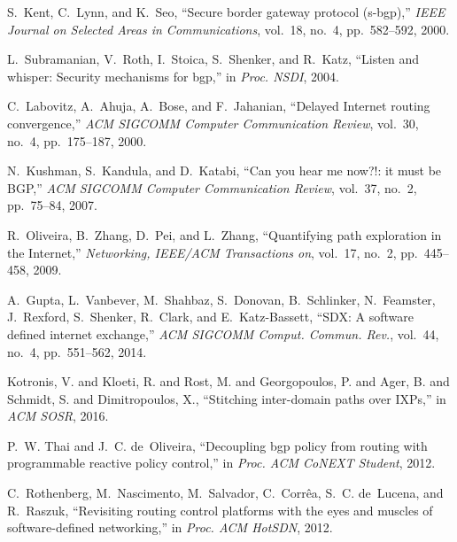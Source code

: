 \documentclass[10pt, conference, letterpaper]{IEEEtran}%
\begin{document}
%


%

%	
\begin{thebibliography}{10}

S.~Kent, C.~Lynn, and K.~Seo, ``Secure border gateway protocol (s-bgp),'' {\em
  IEEE Journal on Selected Areas in Communications}, vol.~18, no.~4,
  pp.~582--592, 2000.

L.~Subramanian, V.~Roth, I.~Stoica, S.~Shenker, and R.~Katz, ``Listen and
  whisper: Security mechanisms for bgp,'' in {\em Proc. NSDI}, 2004.

C.~Labovitz, A.~Ahuja, A.~Bose, and F.~Jahanian, ``Delayed {I}nternet routing
  convergence,'' {\em ACM SIGCOMM Computer Communication Review}, vol.~30,
  no.~4, pp.~175--187, 2000.

N.~Kushman, S.~Kandula, and D.~Katabi, ``Can you hear me now?!: it must be
  {BGP},'' {\em ACM SIGCOMM Computer Communication Review}, vol.~37, no.~2,
  pp.~75--84, 2007.

R.~Oliveira, B.~Zhang, D.~Pei, and L.~Zhang, ``Quantifying path exploration in
  the {I}nternet,'' {\em Networking, IEEE/ACM Transactions on}, vol.~17, no.~2,
  pp.~445--458, 2009.

A.~Gupta, L.~Vanbever, M.~Shahbaz, S.~Donovan, B.~Schlinker, N.~Feamster,
  J.~Rexford, S.~Shenker, R.~Clark, and E.~Katz-Bassett, ``{SDX}: A software
  defined internet exchange,'' {\em ACM SIGCOMM Comput. Commun. Rev.}, vol.~44,
  no.~4, pp.~551--562, 2014.

{Kotronis, V. and Kloeti, R. and Rost, M. and Georgopoulos, P. and Ager, B. and
  Schmidt, S. and Dimitropoulos, X.}, ``Stitching inter-domain paths over
  {IXPs},'' in {\em ACM SOSR}, 2016.

P.~W. Thai and J.~C. de~Oliveira, ``Decoupling bgp policy from routing with
  programmable reactive policy control,'' in {\em Proc. ACM CoNEXT Student},
  2012.

C.~Rothenberg, M.~Nascimento, M.~Salvador, C.~Corr{\^e}a, S.~C. de~Lucena, and
  R.~Raszuk, ``Revisiting routing control platforms with the eyes and muscles
  of software-defined networking,'' in {\em Proc. ACM HotSDN}, 2012.


\end{thebibliography}
\end{document}
